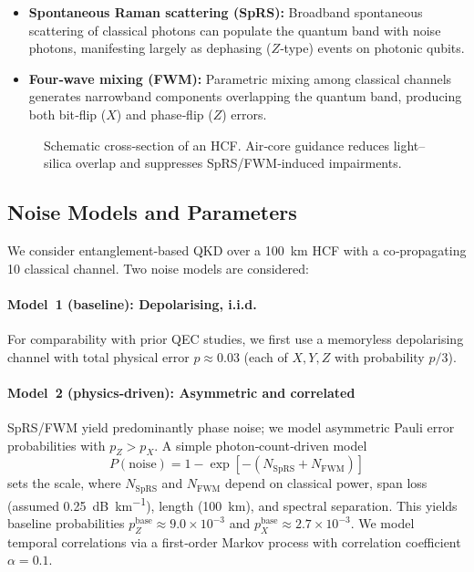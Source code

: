 \documentclass[conference]{IEEEtran}
\begin{document}
\begin{itemize}[leftmargin=*,itemsep=1pt]
  \item \textbf{Spontaneous Raman scattering (SpRS):} Broadband spontaneous scattering of classical photons can populate the quantum band with noise photons, manifesting largely as dephasing ($Z$‑type) events on photonic qubits.
  \item \textbf{Four‑wave mixing (FWM):} Parametric mixing among classical channels generates narrowband components overlapping the quantum band, producing both bit‑flip ($X$) and phase‑flip ($Z$) errors.
\end{itemize}

\begin{figure}[t]
\centering
{}
\caption{Schematic cross‑section of an HCF.  Air‑core guidance reduces light–silica overlap and suppresses SpRS/FWM‑induced impairments.}
\label{fig:hcf}
\end{figure}

\subsection{Noise Models and Parameters}\label{sec:noise_models}
We consider entanglement‑based QKD over a \SI{100}{\kilo\meter} HCF with a co‑propagating \SI{10}{\dBm} classical channel.  Two noise models are considered:

\paragraph*{Model 1 (baseline): Depolarising, i.i.d.}  For comparability with prior QEC studies, we first use a memoryless depolarising channel with total physical error $p\approx 0.03$ (each of $X,Y,Z$ with probability $p/3$).

\paragraph*{Model 2 (physics‑driven): Asymmetric and correlated}  SpRS/FWM yield predominantly phase noise; we model asymmetric Pauli error probabilities with $p_Z>p_X$.  A simple photon‑count‑driven model
\begin{equation}
P(\text{noise})=1-\exp[-(N_{\mathrm{SpRS}}+N_{\mathrm{FWM}})]
\end{equation}
sets the scale, where $N_{\mathrm{SpRS}}$ and $N_{\mathrm{FWM}}$ depend on classical power, span loss (assumed \SI{0.25}{\dB\per\kilo\meter}), length (\SI{100}{\kilo\meter}), and spectral separation.  This yields baseline probabilities $p_Z^{\mathrm{base}}\approx9.0\times10^{-3}$ and $p_X^{\mathrm{base}}\approx2.7\times10^{-3}$.  We model temporal correlations via a first‑order Markov process with correlation coefficient $\alpha=0.1$.
\end{document}

